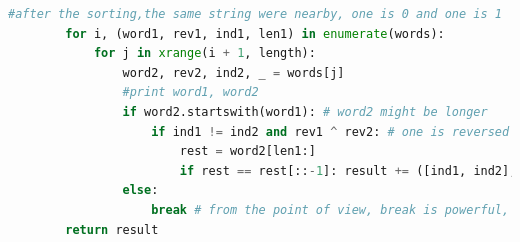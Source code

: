 \documentclass[../main.tex]{subfiles}
\begin{document}
\begin{examples}
\begin{lstlisting}[language = Python]
        #after the sorting,the same string were nearby, one is 0 and one is 1
        for i, (word1, rev1, ind1, len1) in enumerate(words):
            for j in xrange(i + 1, length):
                word2, rev2, ind2, _ = words[j]
                #print word1, word2
                if word2.startswith(word1): # word2 might be longer 
                    if ind1 != ind2 and rev1 ^ rev2: # one is reversed one is not
                        rest = word2[len1:]
                        if rest == rest[::-1]: result += ([ind1, ind2],) if rev2 else ([ind2, ind1],) # if rev2 is reversed, the from ind1 to ind2
                else:
                    break # from the point of view, break is powerful, this way, we only deal with possible reversed, 
        return result
 \end{lstlisting}
 \end{examples}
 

 
     
 
     
 
         
         
 
 
         
 
\end{document}
